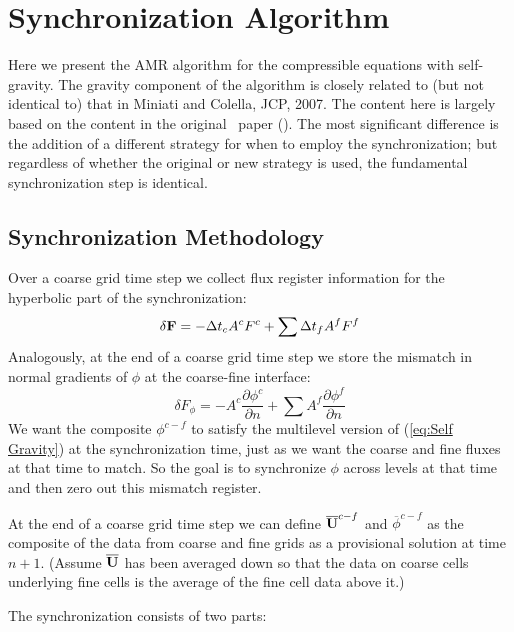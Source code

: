 \section{Synchronization Algorithm}
\label{sec:amr_synchronization}

Here we present the AMR algorithm for the compressible equations with
self-gravity.  The gravity component of the algorithm is closely
related to (but not identical to) that in Miniati and Colella, JCP,
2007. The content here is largely based on the content in the original
\castro\ paper (\cite{castro_I}). The most significant difference is the
addition of a different strategy for when to employ the synchronization;
but regardless of whether the original or new strategy is used, the fundamental
synchronization step is identical.

\subsection{Synchronization Methodology}
\label{sec:synchronization_methodology}

Over a coarse grid time step we collect flux register information for
the hyperbolic part of the synchronization:
\begin{equation}
\delta{\bf F} = -\Delta t_c A^c F^c + \sum \Delta t_f A^f F^f
\end{equation}
Analogously, at the end of a coarse grid time step we store the
mismatch in normal gradients of $\phi$ at the coarse-fine interface:
\begin{equation}
\delta F_\phi =  - A^c \frac{\partial \phi^c}{\partial n}
+ \sum A^f \frac{\partial \phi^f}{\partial n}
\end{equation}
We want the composite $\phi^{c-f}$ to satisfy the multilevel
version of (\ref{eq:Self Gravity}) at the synchronization time, just
as we want the coarse and fine fluxes at that time to match. So the goal
is to synchronize $\phi$ across levels at that time and then zero out
this mismatch register.

At the end of a coarse grid time step we can define
${\overline{{\bf U}}}^{c-f}$ and $\overline{\phi}^{c-f}$ as the composite
of the data from coarse and fine grids as a provisional solution at
time $n+1$. (Assume $\overline{{\bf U}}$ has been averaged down so that
the data on coarse cells underlying fine cells is the average of the
fine cell data above it.)

The synchronization consists of two parts: 


